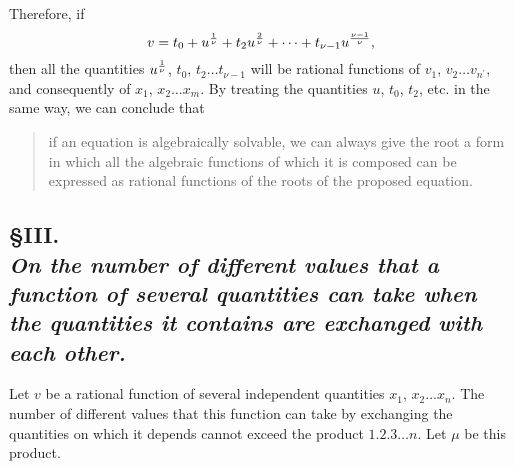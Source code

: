 \documentclass[oneside, 12 pt, leqno]{memoir}
\let\oldfrac\frac
\def\frac#1#2{\mathchoice{\text{\scalebox{.83}{${\oldfrac{#1}{#2}}$}}}{\text{\scalebox{.83}{${\displaystyle\oldfrac{#1}{#2}}$}}}{\genfrac{}{}{}{2}{#1}{#2}}{\genfrac{}{}{}{3}{#1}{#2}}}
\begin{document}
Therefore, if
\[v=t_0+u^{\frac{1}{\nu}}+t_2 u^{\frac{2}{\nu}}+\dots+t_{\nu-1} u^{\frac{\nu-1}{\nu}},\]
then all the quantities \(u^{\frac{1}{\nu}}\), \(t_0\), \(t_2 \dots t_{\nu-1}\) will be rational functions of \(v_1\), \(v_2 \dots v_{n^{\prime}}\), and consequently of \(x_1\), \(x_2 \dots x_m\). By treating the quantities \(u\), \(t_0\), \(t_2\), etc. in the same way, we can conclude that
\begin{quote}
if an equation is algebraically solvable, we can always give the root a form in which all the algebraic functions of which it is composed can be expressed as rational functions of the roots of the proposed equation.
\end{quote}

\subsection*{\S III.\\
{\scriptsize \textit{On the number of different values that a function of several quantities can take when the quantities it contains are exchanged with each other.}}}

Let \(v\) be a rational function of several independent quantities \(x_1\), \(x_2 \dots x_n\). The number of different values that this function can take by exchanging the quantities on which it depends cannot exceed the product \(1.2.3 \dots n\). Let \(\mu\) be this product.
\end{document}
